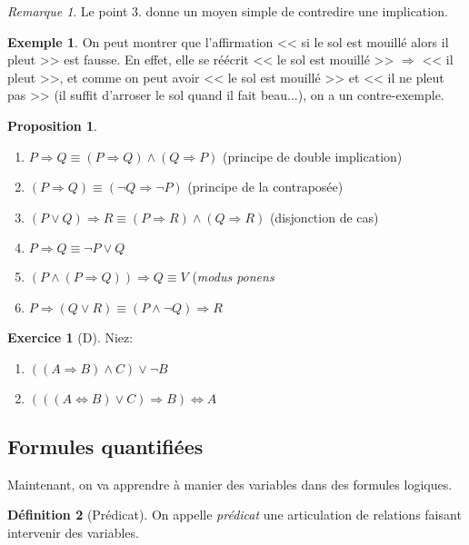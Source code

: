 \documentclass[11pt]{article}
\theoremstyle{definition}
\newtheorem{defn}{Définition}[section]
\newtheorem{prop}[defn]{Proposition}
\newtheorem{exe}{Exemple}
\newtheorem{exo}{Exercice}
\theoremstyle{remark}
\newtheorem{rem}{Remarque}
\begin{document}
\begin{rem}
Le point 3. donne un moyen simple de contredire une implication.
\end{rem}

\begin{exe}
On peut montrer que l'affirmation << si le sol est mouillé alors il pleut >> est fausse. En effet, elle se réécrit << le sol est mouillé >> $\Rightarrow $ << il pleut >>, et comme on peut avoir << le sol est mouillé >> et << il ne pleut pas >> (il suffit d'arroser le sol quand il fait beau...), on a un contre-exemple.
\end{exe}

\begin{prop}\leavevmode
\begin{enumerate}
\item $P\Longrightarrow Q\equiv (P\Longrightarrow Q)\land(Q\Longrightarrow P)$ (principe de double implication)
\item $(P\Rightarrow Q)\equiv (\neg Q\Rightarrow \neg P)$ (principe de la contraposée)
\item $(P\lor Q)\Rightarrow R\equiv (P\Rightarrow R)\land (Q\Rightarrow R)$ (disjonction de cas)
\item $P\Rightarrow Q \equiv \neg P\lor Q$
\item $(P\land (P\Rightarrow Q))\Rightarrow Q\equiv V$ (\textit{modus ponens} 
\item $P\Rightarrow(Q\lor R) \equiv (P\land \neg Q)\Rightarrow R $
\end{enumerate}
\end{prop}

\begin{exo}[D]
Niez:\begin{enumerate}
\item $((A\Rightarrow B)\land C)\lor\neg B$
\item $(((A\Leftrightarrow B)\lor C)\Rightarrow B)\Leftrightarrow A$
\end{enumerate}
\end{exo}

\subsection{Formules quantifiées}

Maintenant, on va apprendre à manier des variables dans des formules logiques.

\begin{defn}[Prédicat]
On appelle \textit{prédicat} une articulation de relations faisant intervenir des variables.
\end{defn}
\end{document}
